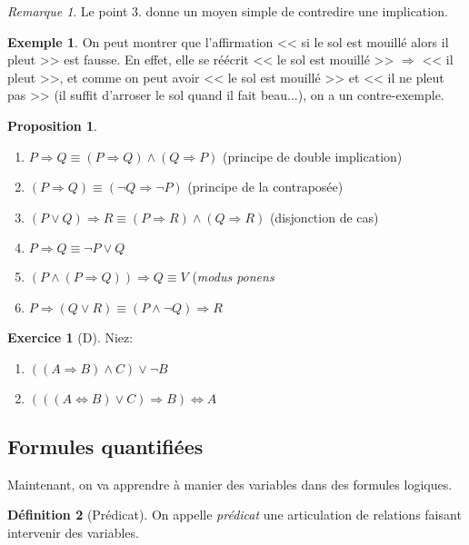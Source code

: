 \documentclass[11pt]{article}
\theoremstyle{definition}
\newtheorem{defn}{Définition}[section]
\newtheorem{prop}[defn]{Proposition}
\newtheorem{exe}{Exemple}
\newtheorem{exo}{Exercice}
\theoremstyle{remark}
\newtheorem{rem}{Remarque}
\begin{document}
\begin{rem}
Le point 3. donne un moyen simple de contredire une implication.
\end{rem}

\begin{exe}
On peut montrer que l'affirmation << si le sol est mouillé alors il pleut >> est fausse. En effet, elle se réécrit << le sol est mouillé >> $\Rightarrow $ << il pleut >>, et comme on peut avoir << le sol est mouillé >> et << il ne pleut pas >> (il suffit d'arroser le sol quand il fait beau...), on a un contre-exemple.
\end{exe}

\begin{prop}\leavevmode
\begin{enumerate}
\item $P\Longrightarrow Q\equiv (P\Longrightarrow Q)\land(Q\Longrightarrow P)$ (principe de double implication)
\item $(P\Rightarrow Q)\equiv (\neg Q\Rightarrow \neg P)$ (principe de la contraposée)
\item $(P\lor Q)\Rightarrow R\equiv (P\Rightarrow R)\land (Q\Rightarrow R)$ (disjonction de cas)
\item $P\Rightarrow Q \equiv \neg P\lor Q$
\item $(P\land (P\Rightarrow Q))\Rightarrow Q\equiv V$ (\textit{modus ponens} 
\item $P\Rightarrow(Q\lor R) \equiv (P\land \neg Q)\Rightarrow R $
\end{enumerate}
\end{prop}

\begin{exo}[D]
Niez:\begin{enumerate}
\item $((A\Rightarrow B)\land C)\lor\neg B$
\item $(((A\Leftrightarrow B)\lor C)\Rightarrow B)\Leftrightarrow A$
\end{enumerate}
\end{exo}

\subsection{Formules quantifiées}

Maintenant, on va apprendre à manier des variables dans des formules logiques.

\begin{defn}[Prédicat]
On appelle \textit{prédicat} une articulation de relations faisant intervenir des variables.
\end{defn}
\end{document}
